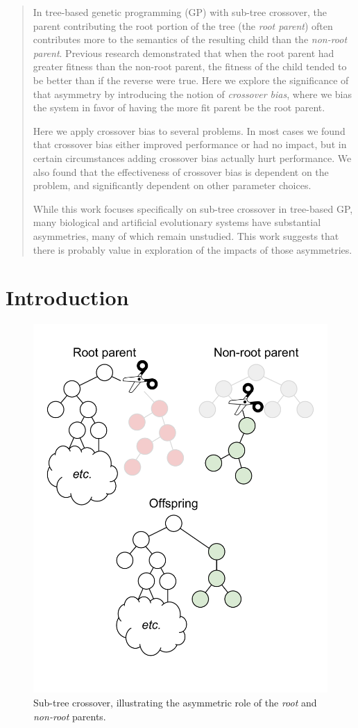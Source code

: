 \documentclass{sig-alternate}
\begin{document}
\begin{abstract}

In tree-based genetic programming (GP) with sub-tree crossover, the parent contributing the root portion of the tree (the
\emph{root parent}) often contributes more to the semantics of the resulting child than the
\emph{non-root parent}. Previous research demonstrated that when the root parent had greater fitness than the non-root
parent, the fitness of the child tended to be better than if the reverse were true. Here we explore the significance of
that asymmetry by introducing the notion of \emph{crossover bias}, where we bias the system in favor of
having the more fit parent be the root parent.

Here we apply crossover bias to several problems. In most cases we found that crossover bias 
either improved performance or had no impact, but in certain circumstances adding
crossover bias actually hurt performance.
We also found that the effectiveness of crossover bias is dependent on the 
problem, and significantly dependent on other parameter choices.

While this work focuses specifically on sub-tree crossover in tree-based GP, many biological and 
artificial evolutionary systems have substantial asymmetries, many of which remain unstudied. This 
work suggests that there is probably value in exploration of the impacts of those asymmetries.

\end{abstract}


\pagebreak

\section{Introduction} \label{sec:Introduction}

\begin{figure}
	\centering
	\includegraphics[width=0.45 \textwidth]{Plots/Root_parent_illustration_no_triangle.pdf}
	\caption{Sub-tree crossover, illustrating the asymmetric role of the \emph{root} and \emph{non-root} parents.}
	\label{fig:root_parent_illustration}
\end{figure}
\end{document}
